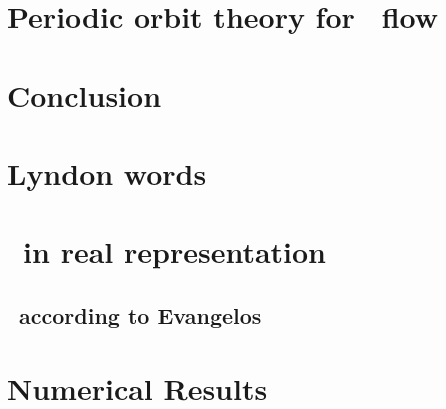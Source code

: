 \chapter{Periodic orbit theory for \KS\ flow}

\chapter{Conclusion}


\appendix

\chapter{Lyndon words}


\chapter{\KSe\ in real representation}

\section{\KSe\ according to Evangelos}


\chapter{Numerical Results}


\begin{postliminary}
\gtindex
    \ifpaper               %
\begin{vita}
    
\end{vita}
    \fi
\end{postliminary}


